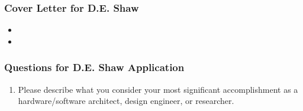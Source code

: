 \begin{frame} 
\frametitle{Cover Letter for D.E. Shaw}

\begin{itemize}
\tiny \item \tiny 
\item \tiny 

\end{itemize}
\end{frame}

\begin{frame}
\frametitle{Questions for D.E. Shaw Application}
\begin{enumerate} 
\tiny \item \tiny Please describe what you consider your most
significant accomplishment as a hardware/software architect, design
engineer, or researcher.
\end{enumerate} 
\end{frame} 


